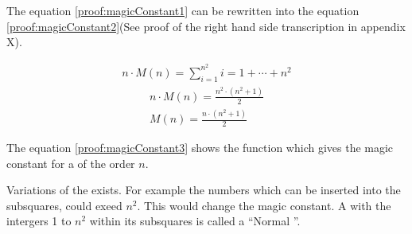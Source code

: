 The equation \ref{proof:magicConstant1} can be rewritten into the equation \ref{proof:magicConstant2}(See proof of the right hand side transcription in appendix X).

\begin{align}
\label{proof:magicConstant1}
	n \cdot M \left( n \right) = \sum ^{n^2}_{i = 1} i = 1 + \cdots + n^2
\end{align}
\begin{align}
\label{proof:magicConstant2}
	n \cdot M \left( n \right) = \frac{n^2 \cdot \left( n^2 + 1 \right)}{2} \\
\label{proof:magicConstant3}
	M \left( n \right) = \frac{n \cdot \left( n^2 + 1 \right)}{2} 
\end{align}

The equation \ref{proof:magicConstant3} shows the function which gives the magic constant for a \msquare{} of the order $n$.

Variations of the \msquare{} exists. For example the numbers which can be inserted into the subsquares, could exeed $n^2$. This would change the magic constant. A \msquare with the intergers 1 to $n^2$ within its subsquares is called a ``Normal \msquare''.